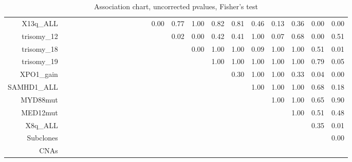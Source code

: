 \documentclass[a4paper,11pt]{article}
\begin{document}
\begin{landscape}
\begin{table}[ht]
{{\begin{tabular}{|r|c|c|c|c|c|c|c|c|c|c|c|c|c|c|c|c|c|c|c|c|c|c|}
  X13q\_ALL &  &  &  &  &  &  &  &  &  &  &  &  & 0.00 & 0.77 & 1.00 & 0.82 & 0.81 & 0.46 & 0.13 & 0.36 & 0.00 & 0.00 \\ 
  trisomy\_12 &  &  &  &  &  &  &  &  &  &  &  &  &  & 0.02 & 0.00 & 0.42 & 0.41 & 1.00 & 0.07 & 0.68 & 0.00 & 0.51 \\ 
  trisomy\_18 &  &  &  &  &  &  &  &  &  &  &  &  &  &  & 0.00 & 1.00 & 1.00 & 0.09 & 1.00 & 1.00 & 0.51 & 0.01 \\ 
  trisomy\_19 &  &  &  &  &  &  &  &  &  &  &  &  &  &  &  & 1.00 & 1.00 & 1.00 & 1.00 & 1.00 & 0.79 & 0.05 \\ 
  XPO1\_gain &  &  &  &  &  &  &  &  &  &  &  &  &  &  &  &  & 0.30 & 1.00 & 1.00 & 0.33 & 0.04 & 0.00 \\ 
  SAMHD1\_ALL &  &  &  &  &  &  &  &  &  &  &  &  &  &  &  &  &  & 1.00 & 1.00 & 1.00 & 0.68 & 0.18 \\ 
  MYD88mut &  &  &  &  &  &  &  &  &  &  &  &  &  &  &  &  &  &  & 1.00 & 1.00 & 0.65 & 0.90 \\ 
  MED12mut &  &  &  &  &  &  &  &  &  &  &  &  &  &  &  &  &  &  &  & 1.00 & 0.51 & 0.48 \\ 
  X8q\_ALL &  &  &  &  &  &  &  &  &  &  &  &  &  &  &  &  &  &  &  &  & 0.35 & 0.01 \\ 
  Subclones &  &  &  &  &  &  &  &  &  &  &  &  &  &  &  &  &  &  &  &  &  & 0.00 \\ 
  CNAs &  &  &  &  &  &  &  &  &  &  &  &  &  &  &  &  &  &  &  &  &  &  \\ 
   \hline
\end{tabular}
}
}
\caption{Association chart, uncorrected pvalues, Fisher's test} 
\end{table}
\begin{table}[ht]
\centering
{\tiny
{}}
\end{table}
\end{landscape}
\end{document}
